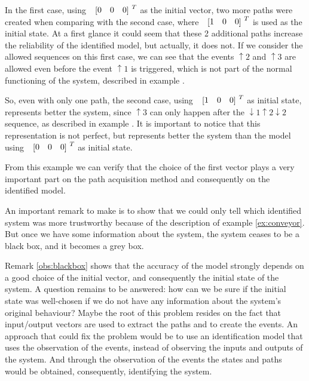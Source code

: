   In the first case, using $\colvec{0&0&0}^T$ as the initial vector, two more
  paths were created when comparing with the second case, where
  $\colvec{1&0&0}^T$ is used as the initial state. At a first glance it could
  seem that these 2 additional paths increase the reliability of the identified model,
  but actually, it does not. If we consider the allowed
  sequences on this first case, we can see that the events $\uparrow 2$ and
  $\uparrow 3$ are allowed even before the event $\uparrow 1$ is triggered,
  which is not part of the normal functioning of the system, described in
  example .

  So, even with only one path, the second case, using $\colvec{1&0&0}^T$ as
  initial state, represents better the system, since $\uparrow 3$ can only happen
  after the $\downarrow 1\uparrow 2\downarrow 2$ sequence, as described in
  example . It is important to notice that this
  representation is not perfect, but represents better the system than the model
  using $\colvec{0&0&0}^T$ as initial state.

  From this example we can verify that the choice of the first vector plays a very important part on
  the
  path acquisition method and consequently on the identified
  model.
  \begin{observation}
    \label{obs:blackbox}
  An important remark to make is to show that we could only tell
  which identified system was more trustworthy because of the description of
  example \ref{ex:conveyor}. But once we have some information about the system,
  the system ceases to be a black box, and it becomes a grey box. 
\end{observation}

Remark \ref{obs:blackbox} shows that the accuracy of the \DAOCT{} model strongly
depends on a good
choice of the initial vector, and consequently the initial state of the
system. A question remains to be answered: how can we be sure if the
initial state was well-chosen if we do not have any information about the system's original behaviour?
Maybe the root of this problem resides on the fact that input\slash output vectors
are used to extract the paths and to create the events. An approach that could
fix the problem would be to use an identification model that uses 
the observation of the events, instead of observing the inputs and
outputs of the system. And through the observation of the events the states and paths would be obtained, consequently, identifying the system.
